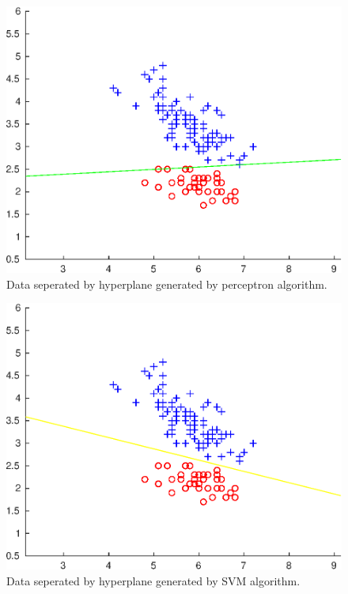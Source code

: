 \documentclass{article}
\begin{document}
	\begin{figure}[H]
		\centering
		\includegraphics{plot4}
		\caption{Data seperated by hyperplane generated by perceptron algorithm.}
	\end{figure}
	\begin{figure}[H]
		\centering
		\includegraphics{plot5}
		\caption{Data seperated by hyperplane generated by SVM algorithm.}
	\end{figure}
\end{document}
